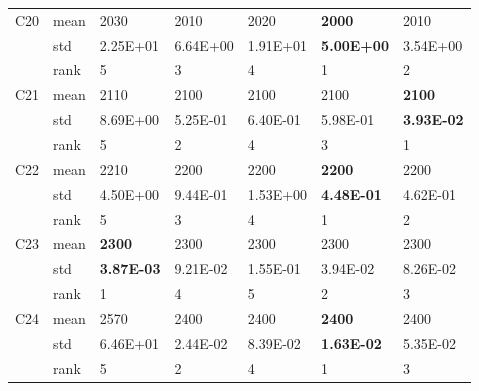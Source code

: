 \begin{table}[]
\begin{tabular}{|l|l|l|l|l|l|l|}
\multirow{3}{*}{C20} & mean & 2030              & 2010              & 2020              & \textbf{2000}     & 2010              \\ \cline{2-7} 
                     & std  & 2.25E+01          & 6.64E+00          & 1.91E+01          & \textbf{5.00E+00} & 3.54E+00          \\ \cline{2-7} 
                     & rank & 5                 & 3                 & 4                 & 1                 & 2                 \\ \hline
\multirow{3}{*}{C21} & mean & 2110              & 2100              & 2100              & 2100              & \textbf{2100}     \\ \cline{2-7} 
                     & std  & 8.69E+00          & 5.25E-01          & 6.40E-01          & 5.98E-01          & \textbf{3.93E-02} \\ \cline{2-7} 
                     & rank & 5                 & 2                 & 4                 & 3                 & 1                 \\ \hline
\multirow{3}{*}{C22} & mean & 2210              & 2200              & 2200              & \textbf{2200}     & 2200              \\ \cline{2-7} 
                     & std  & 4.50E+00          & 9.44E-01          & 1.53E+00          & \textbf{4.48E-01} & 4.62E-01          \\ \cline{2-7} 
                     & rank & 5                 & 3                 & 4                 & 1                 & 2                 \\ \hline
\multirow{3}{*}{C23} & mean & \textbf{2300}     & 2300              & 2300              & 2300              & 2300              \\ \cline{2-7} 
                     & std  & \textbf{3.87E-03} & 9.21E-02          & 1.55E-01          & 3.94E-02          & 8.26E-02          \\ \cline{2-7} 
                     & rank & 1                 & 4                 & 5                 & 2                 & 3                 \\ \hline
\multirow{3}{*}{C24} & mean & 2570              & 2400              & 2400              & \textbf{2400}     & 2400              \\ \cline{2-7} 
                     & std  & 6.46E+01          & 2.44E-02          & 8.39E-02          & \textbf{1.63E-02} & 5.35E-02          \\ \cline{2-7} 
                     & rank & 5                 & 2                 & 4                 & 1                 & 3                 \\ \hline

\end{tabular}
\end{table}
